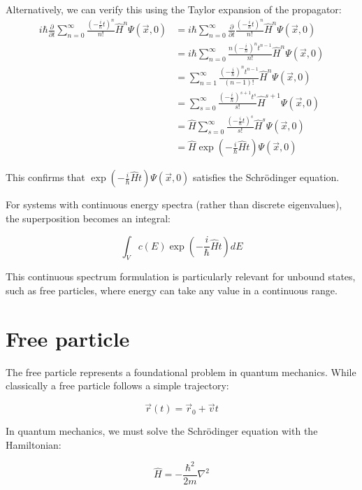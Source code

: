 \documentclass[italian]{HKNdocument}
\begin{document}
Alternatively, we can verify this using the Taylor expansion of the propagator:
\begin{align}
i\hbar\frac{\partial}{\partial t}\sum_{n=0}^{\infty}\frac{\left(-\frac{i}{\hbar}t\right)^n}{n!}\hat{H}^n\Psi(\vec{x},0) &= i\hbar\sum_{n=0}^{\infty}\frac{\partial}{\partial t}\frac{\left(-\frac{i}{\hbar}t\right)^n}{n!}\hat{H}^n\Psi(\vec{x},0) \\
&= i\hbar\sum_{n=0}^{\infty}\frac{n\left(-\frac{i}{\hbar}\right)^nt^{n-1}}{n!}\hat{H}^n\Psi(\vec{x},0) \\
&= \sum_{n=1}^{\infty}\frac{\left(-\frac{i}{\hbar}\right)^nt^{n-1}}{(n-1)!}\hat{H}^n\Psi(\vec{x},0)  \\
&= \sum_{s=0}^{\infty}\frac{\left(-\frac{i}{\hbar}\right)^{s+1}t^s}{s!}\hat{H}^{s+1}\Psi(\vec{x},0) \\
&= \hat{H}\sum_{s=0}^{\infty}\frac{\left(-\frac{i}{\hbar}t\right)^s}{s!}\hat{H}^s\Psi(\vec{x},0) \\
&= \hat{H}\exp\left(-\frac{i}{\hbar}\hat{H}t\right)\Psi(\vec{x},0)
\end{align}

This confirms that $\exp\left(-\frac{i}{\hbar}\hat{H}t\right)\Psi(\vec{x},0)$ satisfies the Schrödinger equation.

For systems with continuous energy spectra (rather than discrete eigenvalues), the superposition becomes an integral:

\begin{equation}
\int_V c(E)\exp\left(-\frac{i}{\hbar}\hat{H}t\right)dE
\end{equation}

This continuous spectrum formulation is particularly relevant for unbound states, such as free particles, where energy can take any value in a continuous range.


\section{Free particle}

The free particle represents a foundational problem in quantum mechanics. While classically a free particle follows a simple trajectory:

\begin{equation}
\vec{r}(t) = \vec{r}_0 + \vec{v}t
\end{equation}

In quantum mechanics, we must solve the Schrödinger equation with the Hamiltonian:

\begin{equation}
\hat{H} = -\frac{\hbar^2}{2m}\nabla^2
\end{equation}
\end{document}
